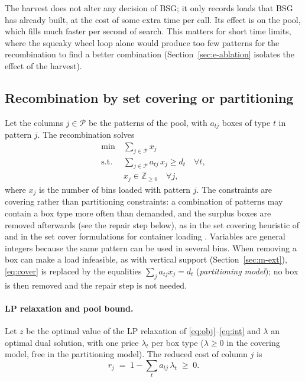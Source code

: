 The harvest does not alter any decision of BSG; it only records loads that BSG has already built,
at the cost of some extra time per call. Its effect is on the pool, which fills much faster per
second of search. This matters for short time limits, where the squeaky wheel loop alone would
produce too few patterns for the recombination to find a better combination
(Section~\ref{sec:e-ablation} isolates the effect of the harvest).

\subsection{Recombination by set covering or partitioning}
\label{sec:m-cover}

Let the columns $j\in\mathcal{P}$ be the patterns of the pool, with $a_{tj}$ boxes of type $t$ in
pattern $j$. The recombination solves
\begin{align}
\min\ & \sum_{j\in\mathcal{P}} x_j \label{eq:obj}\\
\text{s.t.}\ & \sum_{j\in\mathcal{P}} a_{tj}\,x_j \ge d_t \quad \forall t, \label{eq:cover}\\
& x_j\in\mathbb{Z}_{\ge 0}\quad\forall j, \label{eq:int}
\end{align}
where $x_j$ is the number of bins loaded with pattern $j$. The constraints are covering rather than
partitioning constraints: a combination of patterns may contain a box type more often than
demanded, and the surplus boxes are removed afterwards (see the repair step below), as in the set covering
heuristic of \citet{Monaci2006} and in the set cover formulations for container loading
\citep{Che2011,Wei2015}. Variables are
general integers because the same pattern can be used in several bins. When removing a box can make
a load infeasible, as with vertical support (Section~\ref{sec:m-ext}), \eqref{eq:cover} is
replaced by the equalities $\sum_j a_{tj}x_j=d_t$ (\emph{partitioning model}); no box is then
removed and the repair step is not needed.

\paragraph{LP relaxation and pool bound.}
Let $z$ be the optimal value of the LP relaxation of \eqref{eq:obj}--\eqref{eq:int} and
$\lambda$ an optimal dual solution, with one price $\lambda_t$ per box type ($\lambda\ge 0$ in the
covering model, free in the partitioning model). The reduced
cost of column $j$ is
\begin{equation}
\label{eq:rc}
r_j \;=\; 1-\sum_t a_{tj}\,\lambda_t \;\ge\; 0 .
\end{equation}

